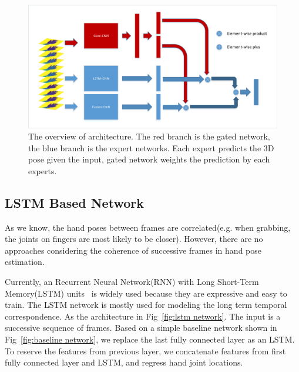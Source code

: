 \documentclass[journal,comsoc]{IEEEtran}
\let\MYoriglatexcaption\caption
\renewcommand{\caption}[2][\relax]{\MYoriglatexcaption[#2]{#2}}
\begin{document}
\begin{figure}[t]
    \centering
    \includegraphics[width=1\linewidth]{src/network/architecture.pdf}
    \caption{The overview of architecture. The red branch is the gated network, the blue branch is the expert networks.
    Each expert predicts the 3D pose given the input, gated network weights the prediction by each experts.}
\label{fig:architecture}
\end{figure}

\subsection{LSTM Based Network}\label{sec:lstm netowork}
As we know, the hand poses between frames are correlated(e.g. when grabbing, the joints on fingers are most likely to be closer).
However, there are no approaches considering the coherence of successive frames in hand pose estimation.

Currently, an Recurrent Neural Network(RNN) with Long Short-Term Memory(LSTM) units~\cite{zaremba2014learning} is widely used
because they are expressive and easy to train. The LSTM network is mostly used for modeling the long term temporal correspondence.
As the architecture in Fig~\ref{fig:lstm network}. The input is a successive sequence of frames.
Based on a simple baseline network shown in Fig~\ref{fig:baseline network}, we replace the last fully connected layer as an LSTM.
To reserve the features from previous layer, we concatenate features from first fully connected layer and LSTM, and regress hand
joint locations.
\end{document}
